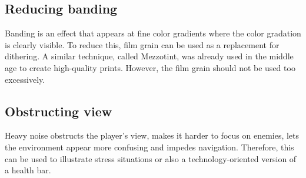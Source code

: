 \documentclass[A4]{article}
\begin{document}
	\subsection{Reducing banding}
	Banding is an effect that appears at fine color gradients where the color gradation is clearly visible. To reduce this, film grain can be used as a replacement for dithering. A similar technique, called Mezzotint, was already used in the middle age to create high-quality prints. However, the film grain should not be used too excessively.
	
	\subsection{Obstructing view}
	Heavy noise obstructs the player's view, makes it harder to focus on enemies, lets the environment appear more confusing and impedes navigation. Therefore, this can be used to illustrate stress situations or also a technology-oriented version of a health bar.
	
	\clearpage
	
\end{document}

